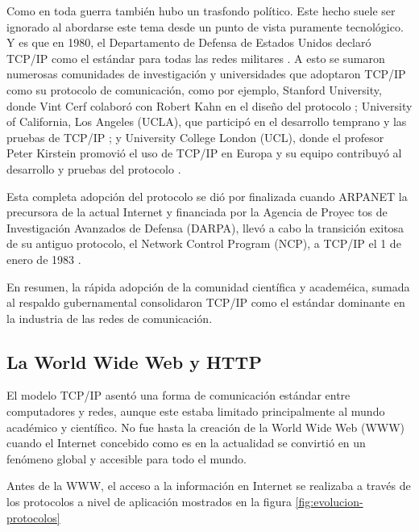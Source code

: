 Como en toda guerra también hubo un trasfondo político. Este hecho suele ser ignorado al abordarse este tema desde un punto de vista puramente tecnológico.
Y es que en 1980, el Departamento de Defensa de Estados Unidos declaró TCP/IP como el estándar para todas las redes militares \cite{leinerBriefHistoryInternet1999}.
A esto se sumaron numerosas comunidades de investigación y universidades que adoptaron TCP/IP como su protocolo de comunicación, como por ejemplo, Stanford University, donde Vint Cerf colaboró con Robert Kahn en el diseño del protocolo \cite{leinerBriefHistoryInternet1999}; University of California, Los Angeles (UCLA), que participó en el desarrollo temprano y las pruebas de TCP/IP \cite{leinerBriefHistoryInternet1999}; y University College London (UCL), donde el profesor Peter Kirstein promovió el uso de TCP/IP en Europa y su equipo contribuyó al desarrollo y pruebas del protocolo \cite{moriPeterKirsteinObituary2020}.

Esta completa adopción del protocolo se dió por finalizada cuando ARPANET la precursora de la actual Internet y financiada por la Agencia de Proyec
tos de Investigación Avanzados de Defensa (DARPA), llevó a cabo la transición exitosa de su antiguo protocolo, el Network Control Program (NCP),
a TCP/IP el 1 de enero de 1983
\cite{leinerBriefHistoryInternet1999}.

En resumen, la rápida adopción de la comunidad científica y academéica, sumada al respaldo gubernamental consolidaron TCP/IP como el estándar dominante en la industria de las redes de comunicación.

\subsection{La World Wide Web y HTTP}
El modelo TCP/IP asentó una forma de comunicación estándar entre computadores y redes, aunque
este estaba limitado principalmente al mundo académico y científico. No fue hasta la creación de la World Wide Web (WWW)
cuando el Internet concebido como es en la actualidad se convirtió en un fenómeno global y accesible para todo el mundo.

Antes de la WWW, el acceso a la información en Internet se realizaba a través de los protocolos a nivel de aplicación mostrados en la figura \ref{fig:evolucion-protocolos}

